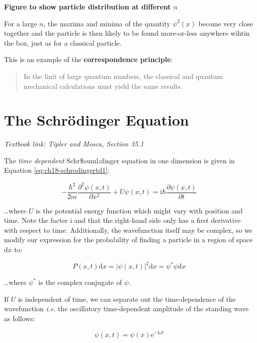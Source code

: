 \documentclass[
]{book}
\begin{document}
\textbf{Figure to show particle distribution at different \(n\)}
\label{fig:ch17-partbox1}

For a large \(n\), the maxima and minima of the quantity \(\psi^2(x)\) become very close together and the particle is then likely to be found more-or-less anywhere wihtin the box, just as for a classical particle.

This is an example of the \textbf{correspondence principle}:

\begin{quote}
In the linit of large quantum numbers, the classical and quantum mechanical calculations must yield the same results.
\end{quote}

\hypertarget{sec:ch18-schrodinger}{%
\chapter{The Schrödinger Equation}\label{sec:ch18-schrodinger}}

\emph{Textbook link: Tipler and Mosca, Section 35.1}

The \emph{time dependent} Schr\$ouml;dinger equation in one dimension is given in Equation \eqref{eq:ch18-schrodingertd1}:

\begin{equation}
-\frac{\hbar^2}{2m} \frac{\partial^2 \psi(x,t)}{\partial x^2} + U \psi(x,t) = \mathrm{i}\hbar \frac{\partial \psi(x,t)}{\partial t}
\label{eq:ch18-schrodingertd1}
\end{equation}

\ldots where \(U\) is the potential energy function which might vary with position and time. Note the facter \(\mathrm{i}\) and that the right-hand side only has a first derivative with respect to time. Additionally, the wavefunction itself may be complex, so we modify our expression for the probability of finding a particle in a region of space \(\mathrm{d}x\) to:

\begin{equation}
P(x,t) \mathrm{d}x = |\psi(x,t)|^2 \mathrm{d}x= \psi^*\psi \mathrm{d}x
\end{equation}

\ldots where \(\psi^*\) is the complex conjugate of \(\psi\).

If \(U\) is independent of time, we can separate out the time-dependence of the wavefunction \emph{i.e.} the oscillatory time-dependent amplitude of the standing wave as follows:

\begin{equation}
\psi(x,t) = \psi(x) \mathrm{e}^{-\mathrm{i}\omega t}
\label{eq:ch18-schrodingerti1}
\end{equation}
\end{document}
